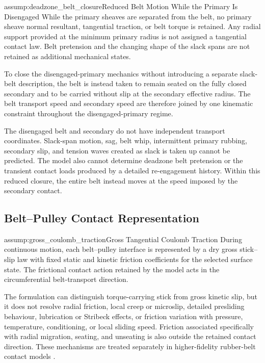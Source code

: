 \documentclass[11pt]{report}
\numberwithin{equation}{section}
\newcounter{assump}
\begin{document}
\begin{assumptionblock}{assump:deadzone_belt_closure}{Reduced Belt Motion While the Primary Is Disengaged}
While the primary sheaves are separated from the belt, no primary sheave
normal resultant, tangential traction, or belt torque is retained. Any radial
support provided at the minimum primary radius is not assigned a tangential
contact law. Belt pretension and the changing shape of the slack spans are not
retained as additional mechanical states.

To close the disengaged-primary mechanics without introducing a separate
slack-belt description, the belt is instead taken to remain seated on the fully
closed secondary and to be carried without slip at the secondary effective
radius. The belt transport speed and secondary speed are therefore joined by
one kinematic constraint throughout the disengaged-primary regime.

\AssumptionConsequences
The disengaged belt and secondary do not have independent transport
coordinates. Slack-span motion, sag, belt whip, intermittent primary rubbing,
secondary slip, and tension waves created as slack is taken up cannot be
predicted. The model also cannot determine deadzone belt pretension or the
transient contact loads produced by a detailed re-engagement history. Within
this reduced closure, the entire belt instead moves at the speed imposed by the
secondary contact.
\end{assumptionblock}

\subsection{Belt--Pulley Contact Representation}

\begin{assumptionblock}{assump:gross_coulomb_traction}{Gross Tangential Coulomb Traction}
During continuous motion, each belt--pulley interface is represented by a dry
gross stick--slip law with fixed static and kinetic friction coefficients for
the selected surface state. The frictional contact action retained by the
model acts in the circumferential belt-transport direction.

\AssumptionConsequences
The formulation can distinguish torque-carrying stick from gross kinetic slip,
but it does not resolve radial friction, local creep or microslip, detailed
presliding behaviour, lubrication or Stribeck effects, or friction variation
with pressure, temperature, conditioning, or local sliding speed. Friction
associated specifically with radial migration, seating, and unseating is also
outside the retained contact direction. These mechanisms are treated
separately in higher-fidelity rubber-belt contact models
\citep{Gerbert1996,KongParker2006}.
\end{assumptionblock}
\end{document}
